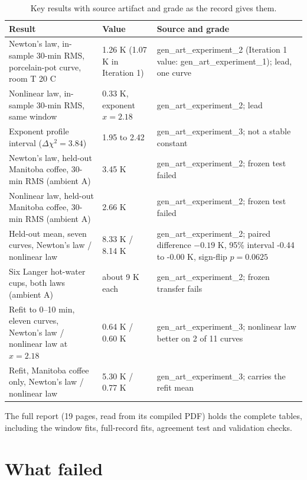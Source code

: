 \documentclass[11pt,letterpaper]{article}
\begin{document}
\begin{table}[!htbp]
\centering
\small
\caption{Key results with source artifact and grade as the record gives them.}
\begin{tabularx}{\linewidth}{p{5.6cm}p{2.9cm}X}
\toprule
Result & Value & Source and grade \\
\midrule
Newton's law, in-sample 30-min RMS, porcelain-pot curve, room T 20 C & 1.26 K (1.07 K in Iteration 1) & gen\_art\_experiment\_2 (Iteration 1 value: gen\_art\_experiment\_1); lead, one curve \\
Nonlinear law, in-sample 30-min RMS, same window & 0.33 K, exponent $x = 2.18$ & gen\_art\_experiment\_2; lead \\
Exponent profile interval ($\Delta\chi^2 = 3.84$) & 1.95 to 2.42 & gen\_art\_experiment\_3; not a stable constant \\
Newton's law, held-out Manitoba coffee, 30-min RMS (ambient A) & 3.45 K & gen\_art\_experiment\_2; frozen test failed \\
Nonlinear law, held-out Manitoba coffee, 30-min RMS (ambient A) & 2.66 K & gen\_art\_experiment\_2; frozen test failed \\
Held-out mean, seven curves, Newton's law / nonlinear law & 8.33 K / 8.14 K & gen\_art\_experiment\_2; paired difference $-0.19$ K, 95\% interval -0.44 to -0.00 K, sign-flip $p = 0.0625$ \\
Six Langer hot-water cups, both laws (ambient A) & about 9 K each & gen\_art\_experiment\_2; frozen transfer fails \\
Refit to 0--10 min, eleven curves, Newton's law / nonlinear law at $x = 2.18$ & 0.64 K / 0.60 K & gen\_art\_experiment\_3; nonlinear law better on 2 of 11 curves \\
Refit, Manitoba coffee only, Newton's law / nonlinear law & 5.30 K / 0.77 K & gen\_art\_experiment\_3; carries the refit mean \\
\bottomrule
\end{tabularx}
\end{table}

The full report (19 pages, read from its compiled PDF) holds the complete tables, including the window fits, full-record fits, agreement test and validation checks.

\section*{What failed}
\end{document}

